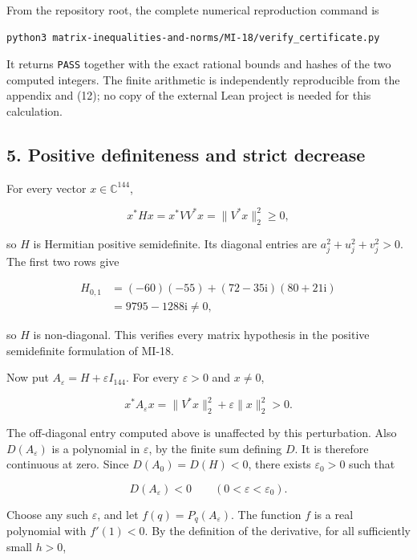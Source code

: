 \documentclass[10pt,a4paper]{article}
\begin{document}
From the repository root, the complete numerical reproduction command is

\begin{verbatim}
python3 matrix-inequalities-and-norms/MI-18/verify_certificate.py
\end{verbatim}

It returns \texttt{PASS} together with the exact rational bounds and
hashes of the two computed integers. The finite arithmetic is
independently reproducible from the appendix and (12); no copy of the
external Lean project is needed for this calculation.

\newpage
\subsection{5. Positive definiteness and strict
decrease}\label{positive-definiteness-and-strict-decrease}

For every vector \(x\in\mathbb C^{144}\),

\nopagebreak[4]
\[
x^*Hx=x^*VV^*x=\|V^*x\|_2^2\ge0,
\]

so \(H\) is Hermitian positive semidefinite. Its diagonal entries are
\(a_j^2+u_j^2+v_j^2>0\). The first two rows give

\nopagebreak[4]
\[
\begin{aligned}
H_{0,1}
&=(-60)(-55)+(72-35\mathrm{i})(80+21\mathrm{i})\\
&=9795-1288\mathrm{i}\ne0,
\end{aligned}
\]

so \(H\) is non-diagonal. This verifies every matrix hypothesis in the
positive semidefinite formulation of MI-18.

Now put \(A_\varepsilon=H+\varepsilon I_{144}\). For every
\(\varepsilon>0\) and \(x\ne0\),

\nopagebreak[4]
\[
x^*A_\varepsilon x=\|V^*x\|_2^2+\varepsilon\|x\|_2^2>0.
\]

The off-diagonal entry computed above is unaffected by this
perturbation. Also \(D(A_\varepsilon)\) is a polynomial in
\(\varepsilon\), by the finite sum defining \(D\). It is therefore
continuous at zero. Since \(D(A_0)=D(H)<0\), there exists
\(\varepsilon_0>0\) such that

\nopagebreak[4]
\[
D(A_\varepsilon)<0\qquad(0<\varepsilon<\varepsilon_0).
\]

Choose any such \(\varepsilon\), and let \(f(q)=P_q(A_\varepsilon)\).
The function \(f\) is a real polynomial with \(f'(1)<0\). By the
definition of the derivative, for all sufficiently small \(h>0\),
\end{document}
